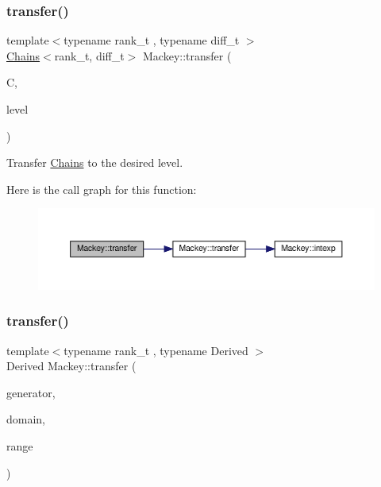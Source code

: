 \subsubsection{\texorpdfstring{transfer()}{transfer()}\hspace{0.1cm}{\footnotesize\ttfamily [4/5]}}
{\footnotesize\ttfamily template$<$typename rank\+\_\+t , typename diff\+\_\+t $>$ \\
\hyperlink{classMackey_1_1Chains}{Chains}$<$rank\+\_\+t, diff\+\_\+t$>$ Mackey\+::transfer (\begin{DoxyParamCaption}\item[{const \hyperlink{classMackey_1_1Chains}{Chains}$<$ rank\+\_\+t, diff\+\_\+t $>$ \&}]{C,  }\item[{int}]{level }\end{DoxyParamCaption})}



Transfer \hyperlink{classMackey_1_1Chains}{Chains} to the desired level. 

Here is the call graph for this function\+:\nopagebreak
\begin{figure}[H]
\begin{center}
\leavevmode
\includegraphics[width=350pt]{namespaceMackey_a50837580391b5c6705e23c637d742b22_cgraph}
\end{center}
\end{figure}
\mbox{\label{namespaceMackey_a0550bf97e47b3c319cb5e1bd81008d89}} 
\subsubsection{\texorpdfstring{transfer()}{transfer()}\hspace{0.1cm}{\footnotesize\ttfamily [5/5]}}
{\footnotesize\ttfamily template$<$typename rank\+\_\+t , typename Derived $>$ \\
Derived Mackey\+::transfer (\begin{DoxyParamCaption}\item[{const Eigen\+::\+Matrix\+Base$<$ Derived $>$ \&}]{generator,  }\item[{const rank\+\_\+t \&}]{domain,  }\item[{const rank\+\_\+t \&}]{range }\end{DoxyParamCaption})}



